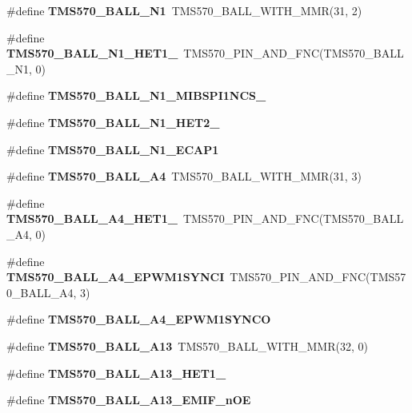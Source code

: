 \begin{DoxyCompactItemize}
\#define {\bfseries T\+M\+S570\+\_\+\+B\+A\+L\+L\+\_\+\+N1}~T\+M\+S570\+\_\+\+B\+A\+L\+L\+\_\+\+W\+I\+T\+H\+\_\+\+M\+MR(31, 2)
\item 
\mbox{\label{tms570lc4357-pins_8h_a9236aa9172874feefcbe818c6485de28}} 
\#define {\bfseries T\+M\+S570\+\_\+\+B\+A\+L\+L\+\_\+\+N1\+\_\+\+H\+E\+T1\+\_}~T\+M\+S570\+\_\+\+P\+I\+N\+\_\+\+A\+N\+D\+\_\+\+F\+NC(T\+M\+S570\+\_\+\+B\+A\+L\+L\+\_\+\+N1, 0)
\item 
\#define {\bfseries T\+M\+S570\+\_\+\+B\+A\+L\+L\+\_\+\+N1\+\_\+\+M\+I\+B\+S\+P\+I1\+N\+C\+S\+\_}
\item 
\#define {\bfseries T\+M\+S570\+\_\+\+B\+A\+L\+L\+\_\+\+N1\+\_\+\+H\+E\+T2\+\_}
\item 
\#define {\bfseries T\+M\+S570\+\_\+\+B\+A\+L\+L\+\_\+\+N1\+\_\+\+E\+C\+A\+P1}
\item 
\mbox{\label{tms570lc4357-pins_8h_acff845f05672e27a1f1b8fb9faf5e021}} 
\#define {\bfseries T\+M\+S570\+\_\+\+B\+A\+L\+L\+\_\+\+A4}~T\+M\+S570\+\_\+\+B\+A\+L\+L\+\_\+\+W\+I\+T\+H\+\_\+\+M\+MR(31, 3)
\item 
\mbox{\label{tms570lc4357-pins_8h_afc87353a4cf352643cb47457658426cf}} 
\#define {\bfseries T\+M\+S570\+\_\+\+B\+A\+L\+L\+\_\+\+A4\+\_\+\+H\+E\+T1\+\_}~T\+M\+S570\+\_\+\+P\+I\+N\+\_\+\+A\+N\+D\+\_\+\+F\+NC(T\+M\+S570\+\_\+\+B\+A\+L\+L\+\_\+\+A4, 0)
\item 
\mbox{\label{tms570lc4357-pins_8h_abb360bb9328d0732273246e10a1f4f26}} 
\#define {\bfseries T\+M\+S570\+\_\+\+B\+A\+L\+L\+\_\+\+A4\+\_\+\+E\+P\+W\+M1\+S\+Y\+N\+CI}~T\+M\+S570\+\_\+\+P\+I\+N\+\_\+\+A\+N\+D\+\_\+\+F\+NC(T\+M\+S570\+\_\+\+B\+A\+L\+L\+\_\+\+A4, 3)
\item 
\#define {\bfseries T\+M\+S570\+\_\+\+B\+A\+L\+L\+\_\+\+A4\+\_\+\+E\+P\+W\+M1\+S\+Y\+N\+CO}
\item 
\mbox{\label{tms570lc4357-pins_8h_a505e115e30eee869acbfd353831effef}} 
\#define {\bfseries T\+M\+S570\+\_\+\+B\+A\+L\+L\+\_\+\+A13}~T\+M\+S570\+\_\+\+B\+A\+L\+L\+\_\+\+W\+I\+T\+H\+\_\+\+M\+MR(32, 0)
\item 
\#define {\bfseries T\+M\+S570\+\_\+\+B\+A\+L\+L\+\_\+\+A13\+\_\+\+H\+E\+T1\+\_}
\item 
\#define {\bfseries T\+M\+S570\+\_\+\+B\+A\+L\+L\+\_\+\+A13\+\_\+\+E\+M\+I\+F\+\_\+n\+OE}

\end{DoxyCompactItemize}
